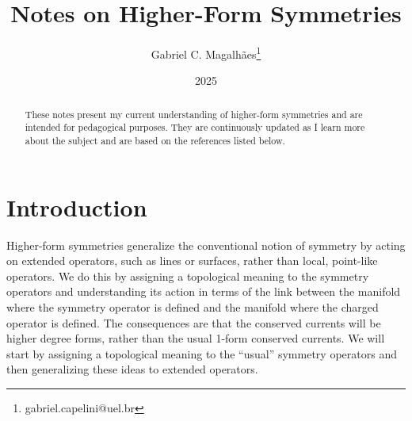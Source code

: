 \documentclass{article}
\title{Notes on Higher-Form Symmetries}
\author{Gabriel C. Magalhães\footnote{gabriel.capelini@uel.br}}
\date{2025}
\begin{document}
\maketitle

\begin{abstract}
These notes present  my current understanding of higher-form symmetries and are intended for pedagogical purposes. They are continuously updated as I learn more about the subject and are based on the references listed below.
\end{abstract}

\tableofcontents
\pagebreak

\section{Introduction}
Higher-form symmetries generalize the conventional notion of symmetry by acting on extended operators, such as lines or surfaces, rather than local, point-like operators. We do this by assigning a topological meaning to the symmetry operators and understanding its action in terms of the link between the manifold where the symmetry operator is defined and the manifold where the charged operator is defined. The consequences are that the conserved currents will be higher degree forms, rather than the usual 1-form conserved currents. We will start by assigning a topological meaning to the ``usual'' symmetry operators and then generalizing these ideas to extended operators.
\end{document}
